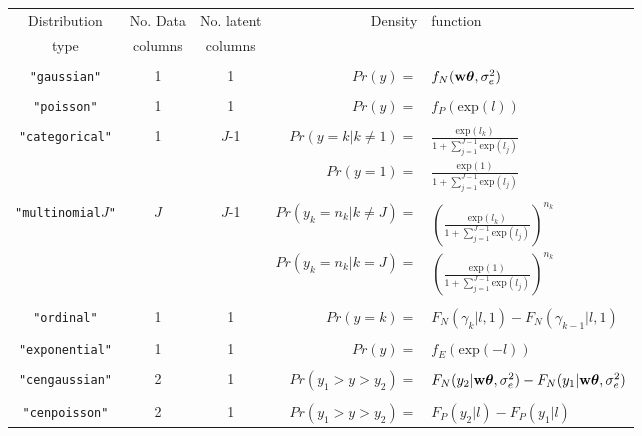 \documentclass{article}
\begin{document}
\begin{landscape}
\begin{table}
\begin{center}
\small
\begin{tabular}{cccrl}
\hline
Distribution   &    No. Data       &         No. latent        &  Density & function \\
   type        &      columns      &           columns            &          &           \\   
\hline\\
   \texttt{"gaussian"}        &  1  &   1  &         $Pr(y) =$&$f_{N}({\bf w}{\bm \theta},\sigma^{2}_{e})$\\   
&&&&\\
   \texttt{"poisson"}        &  1  &   1 &               $Pr(y) =$&$ f_{P}(\textrm{exp}(l))$\\   
&&&&\\
   \texttt{"categorical"}        &  1  &   $J$-1  &     $Pr(y=k | k\neq1) =$&$ \frac{\textrm{exp}(l_{k})}{1+\sum^{J-1}_{j=1}\textrm{exp}(l_{j})}$ \\   
           &   &     &                                  $Pr(y=1) =$&$ \frac{\textrm{exp}(1)}{1+\sum^{J-1}_{j=1}\textrm{exp}(l_{j})}$ \\   
&&&&\\
   \texttt{"multinomial$J$"}  &  $J$    &  $J$-1  &     $Pr(y_{k}=n_{k}| k\neq J) =$&$ \left(\frac{\textrm{exp}(l_{k})}{1+\sum^{J-1}_{j=1}\textrm{exp}(l_{j})}\right)^{n_{k}}$ \\   
    &      &   &     $Pr(y_{k}=n_{k} | k=J) =$&$ \left(\frac{\textrm{exp}(1)}{1+\sum^{J-1}_{j=1}\textrm{exp}(l_{j})}\right)^{n_{k}}$ \\   
&&&&\\ 
   \texttt{"ordinal"}  &  1    &  1     &              $Pr(y=k) =$&$ F_{N}(\gamma_{k} | l,1)-F_{N}(\gamma_{k-1} | l,1)$ \\   
&&&&\\
   \texttt{"exponential"}         &  1  &   1  &         $Pr(y)=$&$ f_{E}(\textrm{exp}(-l))$\\      
&&&&\\
   \texttt{"cengaussian"}        &  2 &   1  &        $Pr(y_{1}>y>y_{2}) =$&$ F_{N}(y_{2} | {\bf w}{\bm \theta},\sigma^{2}_{e})-F_{N}( y_{1} | {\bf w}{\bm \theta},\sigma^{2}_{e})$\\
&&&&\\
   \texttt{"cenpoisson"}        &  2  &   1  &        $Pr(y_{1}>y>y_{2}) =$&$ F_{P}(y_{2} | l)-F_{P}(y_{1} | l)$\\

\end{tabular}
\end{center}
\end{table}
\end{landscape}
\end{document}
